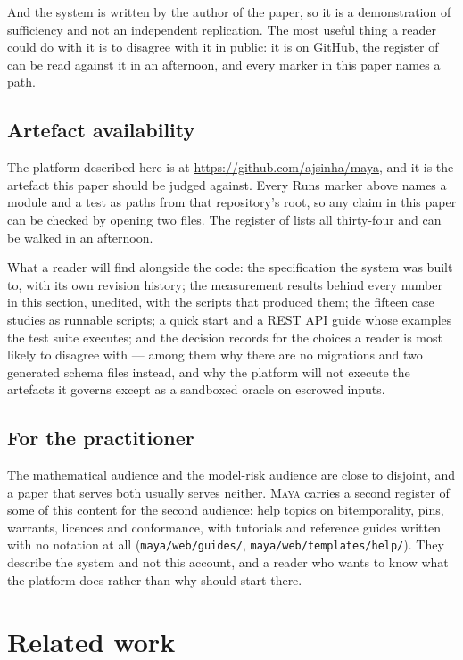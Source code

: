 \documentclass[11pt,a4paper]{article}
\renewcommand{\_}{\oldunderscore\allowbreak}
\theoremstyle{plain}
\theoremstyle{definition}
\theoremstyle{definition}
\theoremstyle{remark}
\begin{document}
And the system is written by the author of the paper, so it is a demonstration of sufficiency and not an
independent replication. The most useful thing a reader could do with it is to disagree with it in
public: it is on GitHub, the register of  can be read against it in an afternoon, and
every marker in this paper names a path.

\subsection{Artefact availability}

The platform described here is at \url{https://github.com/ajsinha/maya}, and it is the artefact this
paper should be judged against. Every \textsf{Runs} marker above names a module and a test as paths from
that repository's root, so any claim in this paper can be checked by opening two files. The register of
 lists all thirty-four and can be walked in an afternoon.

What a reader will find alongside the code: the specification the system was built to, with its own
revision history; the measurement results behind every number in this section, unedited, with the
scripts that produced them; the fifteen case studies as runnable scripts; a quick start and a REST API
guide whose examples the test suite executes; and the decision records for the choices a reader is most
likely to disagree with --- among them why there are no migrations and two generated schema files instead,
and why the platform will not execute the artefacts it governs except as a sandboxed oracle on escrowed
inputs.

\subsection{For the practitioner}

The mathematical audience and the model-risk audience are close to disjoint, and a paper that serves both
usually serves neither. \textsc{Maya} carries a second register of some of this content for the second
audience: help topics on bitemporality, pins, warrants, licences and conformance, with tutorials and
reference guides written with no notation at all (\texttt{maya/web/guides/},
\texttt{maya/web/templates/help/}). They describe the system and not this account, and a reader who wants
to know what the platform does rather than why should start there.
\section{Related work}\label{sec:related}
\end{document}
